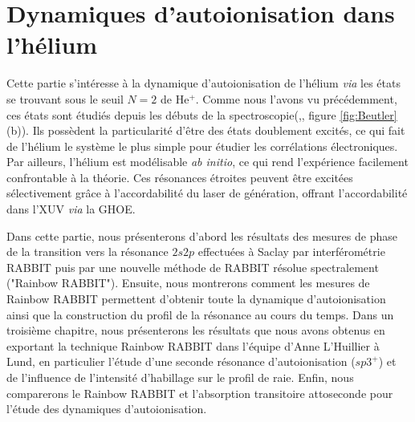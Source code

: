 \part{Dynamiques d'autoionisation dans l'hélium}
\label{part:Helium}
Cette partie s'intéresse à la dynamique d'autoionisation de l'hélium \textit{via} les états se trouvant sous le seuil $N=2$ de He$^+$. Comme nous l'avons vu précédemment, ces états sont étudiés depuis les débuts de la spectroscopie(,, figure \ref{fig:Beutler}(b)). Ils possèdent la particularité d'être des états doublement excités, ce qui fait de l'hélium le système le plus simple pour étudier les corrélations électroniques. Par ailleurs, l'hélium est modélisable \textit{ab initio}, ce qui rend l'expérience facilement confrontable à la théorie. Ces résonances étroites peuvent être excitées sélectivement grâce à l'accordabilité du laser de génération, offrant l'accordabilité dans l'XUV \textit{via} la GHOE.

Dans cette partie, nous présenterons d'abord les résultats des mesures de phase de la transition vers la résonance $2s2p$ effectuées à Saclay par interférométrie RABBIT puis par une nouvelle méthode de RABBIT résolue spectralement ("Rainbow RABBIT"). Ensuite, nous montrerons comment les mesures de Rainbow RABBIT permettent d'obtenir toute la dynamique d'autoionisation ainsi que la construction du profil de la résonance au cours du temps. Dans un troisième chapitre, nous présenterons les résultats que nous avons obtenus en exportant la technique Rainbow RABBIT dans l'équipe d'Anne L'Huillier à Lund, en particulier l'étude d'une seconde résonance d'autoionisation ($sp3^+$) et de l'influence de l'intensité d'habillage sur le profil de raie. Enfin, nous comparerons le Rainbow RABBIT et l'absorption transitoire attoseconde pour l'étude des dynamiques d'autoionisation.

